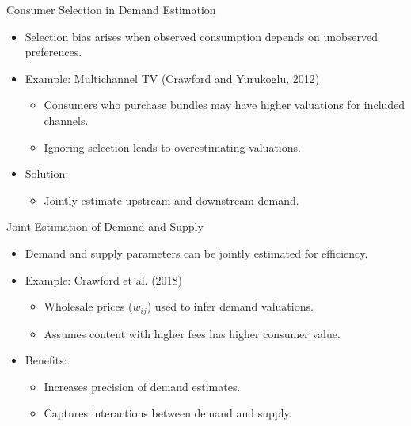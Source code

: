 \documentclass[aspectratio=169]{beamer}  %
\begin{document}
\begin{frame}{Consumer Selection in Demand Estimation}
    \begin{itemize}
        \item Selection bias arises when observed consumption depends on unobserved preferences.
        \item Example: Multichannel TV (Crawford and Yurukoglu, 2012)
        \begin{itemize}
            \item Consumers who purchase bundles may have higher valuations for included channels.
            \item Ignoring selection leads to overestimating valuations.
        \end{itemize}
        \item Solution:
        \begin{itemize}
            \item Jointly estimate upstream and downstream demand.
        \end{itemize}
    \end{itemize}
\end{frame}

\begin{frame}{Joint Estimation of Demand and Supply}
    \begin{itemize}
        \item Demand and supply parameters can be jointly estimated for efficiency.
        \item Example: Crawford et al. (2018)
        \begin{itemize}
            \item Wholesale prices (\(w_{ij}\)) used to infer demand valuations.
            \item Assumes content with higher fees has higher consumer value.
        \end{itemize}
        \item Benefits:
        \begin{itemize}
            \item Increases precision of demand estimates.
            \item Captures interactions between demand and supply.
        \end{itemize}
    \end{itemize}
\end{frame}
\end{document}

